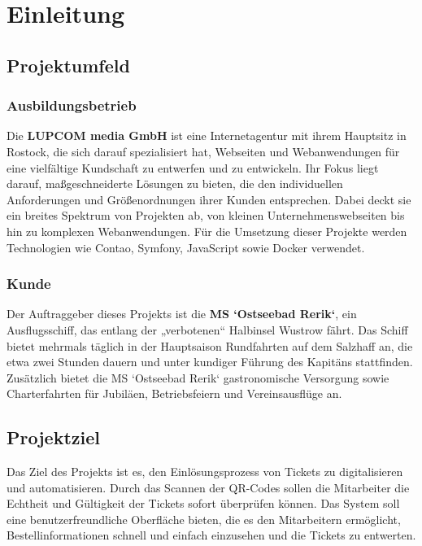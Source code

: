 \section{Einleitung}
\label{sec:Einleitung}


\subsection{Projektumfeld} 
\label{sec:Projektumfeld}

\subsubsection{Ausbildungsbetrieb}

Die \textbf{LUPCOM media GmbH} ist eine Internetagentur mit ihrem Hauptsitz in Rostock, die sich darauf spezialisiert hat, Webseiten und Webanwendungen für eine vielfältige Kundschaft zu entwerfen und zu entwickeln. Ihr Fokus liegt darauf, maßgeschneiderte Lösungen zu bieten, die den individuellen Anforderungen und Größenordnungen ihrer Kunden entsprechen. Dabei deckt sie ein breites Spektrum von Projekten ab, von kleinen Unternehmenswebseiten bis hin zu komplexen Webanwendungen. Für die Umsetzung dieser Projekte werden Technologien wie Contao, Symfony, JavaScript sowie Docker verwendet.

\subsubsection{Kunde}

Der Auftraggeber dieses Projekts ist die \textbf{MS `Ostseebad Rerik`}, ein Ausflugsschiff, das entlang der „verbotenen“ Halbinsel Wustrow fährt. Das Schiff bietet mehrmals täglich in der Hauptsaison Rundfahrten auf dem Salzhaff an, die etwa zwei Stunden dauern und unter kundiger Führung des Kapitäns stattfinden. Zusätzlich bietet die MS `Ostseebad Rerik` gastronomische Versorgung sowie Charterfahrten für Jubiläen, Betriebsfeiern und Vereinsausflüge an.


\subsection{Projektziel} 
\label{sec:Projektziel}

Das Ziel des Projekts ist es, den Einlösungsprozess von Tickets zu digitalisieren und automatisieren. Durch das Scannen der QR-Codes sollen die Mitarbeiter die Echtheit und Gültigkeit der Tickets sofort überprüfen können. Das System soll eine benutzerfreundliche Oberfläche bieten, die es den Mitarbeitern ermöglicht, Bestellinformationen schnell und einfach einzusehen und die Tickets zu entwerten.

